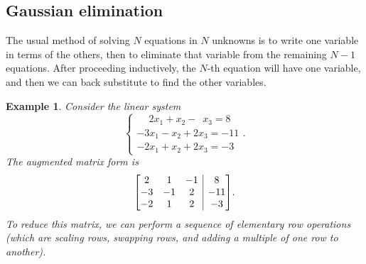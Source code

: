 \documentclass[11pt, a4paper]{article}
\makeatletter
\theoremstyle{break}
\newtheorem{eg}[thm]{Example}
\newenvironment{amatrix}[1]{%
	\left[\begin{array}{@{}*{#1}{c}|c@{}}
	}{%
	\end{array}\right]
}
\makeatother
\begin{document}
\subsection{Gaussian elimination}


The usual method of solving $N$ equations in $N$ unknowns is to write one variable in terms of the others, then to eliminate that variable from the remaining $N-1$ equations. After proceeding inductively, the $N$-th equation will have one variable, and then we can back substitute to find the other variables.

\begin{eg} Consider the linear system
	\[\begin{cases}
		\phantom{-}2x_1+x_2-\phantom{2}x_3=8\\-3x_1-x_2+2x_3=-11\\-2x_1+x_2+2x_3=-3
	\end{cases}.\] The augmented matrix form is \[\begin{amatrix}{3}
	2&1&-1&8\\-3&-1&2&-11\\-2&1&2&-3
	\end{amatrix}.\]
	To reduce this matrix, we can perform a sequence of elementary row operations (which are scaling rows, swapping rows, and adding a multiple of one row to another).
	

\end{eg}
\end{document}
